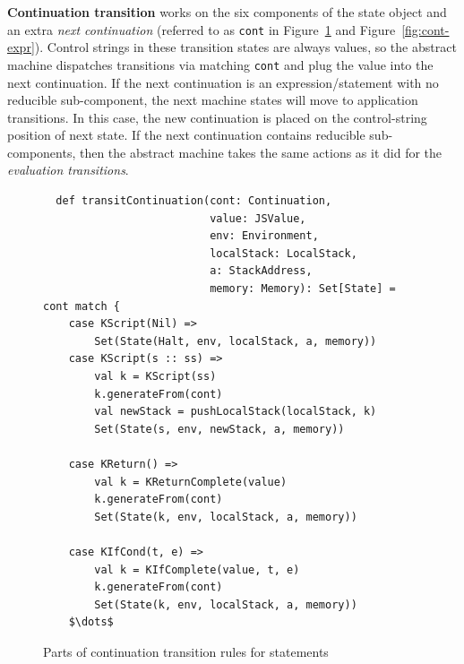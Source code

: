 \documentclass[12pt]{report}
\begin{document}
\textbf{Continuation transition} works on the six components of the state object and an extra \emph{next continuation} (referred to as \verb|cont| in Figure~\ref{fig:cont-stmt} and Figure~\ref{fig:cont-expr}).
Control strings in these transition states are always values, so the abstract machine dispatches transitions via matching \verb|cont| and plug the value into the next continuation.
If the next continuation is an expression/statement with no reducible sub-component, the next machine states will move to application transitions.
In this case, the new continuation is placed on the control-string position of next state.
If the next continuation contains reducible sub-components, then the abstract machine takes the same actions
as it did for the {\em evaluation transitions}.

\begin{figure}
\lstset{language=Scala, mathescape}
\begin{lstlisting}
  def transitContinuation(cont: Continuation,
                          value: JSValue,
                          env: Environment,
                          localStack: LocalStack,
                          a: StackAddress,
                          memory: Memory): Set[State] = cont match {
    case KScript(Nil) =>
        Set(State(Halt, env, localStack, a, memory))
    case KScript(s :: ss) =>
        val k = KScript(ss)
        k.generateFrom(cont)
        val newStack = pushLocalStack(localStack, k)
        Set(State(s, env, newStack, a, memory))

    case KReturn() =>
        val k = KReturnComplete(value)
        k.generateFrom(cont)
        Set(State(k, env, localStack, a, memory))

    case KIfCond(t, e) =>
        val k = KIfComplete(value, t, e)
        k.generateFrom(cont)
        Set(State(k, env, localStack, a, memory))
    $\dots$
\end{lstlisting}
\caption{Parts of continuation transition rules for statements}
\label{fig:cont-stmt}
\end{figure}
\end{document}
